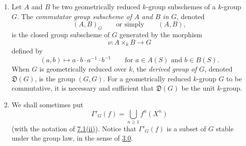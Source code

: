 
\begin{enumerate}
\item[\textup{(vii)}]\label{def:sga3-VIB-7.2-vii}\label{def:sga3-VIB-7.2.2}\label{def:sga3-VIB-7.2.2-a}%
  Let \(A\) and \(B\) be two geometrically reduced \(k\)-group
  subschemes of a \(k\)-group \(G\). The \emph{commutator group
  subscheme of \(A\) and \(B\) in \(G\)}, denoted
  \[
    (A,B)_G
    \qquad\text{or simply}\qquad
    (A,B),
  \]
  is the closed group subscheme of \(G\) generated by the
  morphism
  \label{form:sga3-VIB-7.2.2-commutator}%
  \[
    \nu:A\times_kB\longrightarrow G
  \]
  defined by
  \[
    (a,b)\longmapsto a\cdot b\cdot a^{-1}\cdot b^{-1}
    \qquad\text{for }a\in A(S)\text{ and }b\in B(S).
  \]
  When \(G\) is geometrically reduced over \(k\), the
  \emph{derived group of \(G\)}, denoted \(\mathfrak{D}(G)\), is
  the group \((G,G)\). For a geometrically reduced \(k\)-group
  \(G\) to be commutative, it is necessary and sufficient that
  \(\mathfrak{D}(G)\) be the unit \(k\)-group.

\item[\textup{(viii)}]\label{def:sga3-VIB-7.2-viii}
  We shall sometimes put
  \[
    \Gamma'_G(f)=\bigcup_{n\geq1}f^n(X^n)
  \]
  \textup{(}with the notation of
  \hyperref[concl:sga3-VIB-7.1-ii]{7.1\textup{(ii)}}\textup{)}. Notice
  that \(\Gamma'_G(f)\) is a subset of \(G\) stable under the group
  law, in the sense of \hyperref[par:sga3-VIB-3.0]{3.0}.
\end{enumerate}

